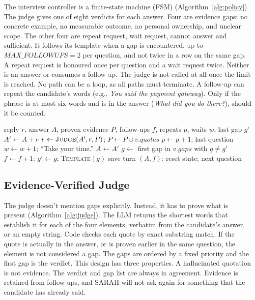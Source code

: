 \documentclass[conference]{IEEEtran}
\begin{document}
The interview controller is a finite-state machine (FSM) (Algorithm~\ref{alg:policy}). The judge gives one of eight verdicts for each answer. Four are evidence gaps: no concrete example, no measurable outcome, no personal ownership, and unclear scope. The other four are repeat request, wait request, cannot answer and sufficient. It follows its template when a gap is encountered, up to $\mathit{MAX\_FOLLOWUPS} = 2$ per question, and not twice in a row on the same gap. A repeat request is honoured once per question and a wait request twice. Neither is an answer or consumes a follow-up. The judge is not called at all once the limit is reached. No path can be a loop, as all paths must terminate. A follow-up can repeat the candidate's words (e.g., \textit{You said the payment gateway}). Only if the phrase is at most six words and is in the answer (\textit{What did you do there?}), should it be counted.

\begin{algorithm}[t]
\caption{Bounded probing policy (one reply)}
\label{alg:policy}
\small
\begin{algorithmic}
\Require reply $r$, answer $A$, proven evidence $P$, follow-ups $f$, repeats $p$, waits $w$, last gap $g'$
\State $A' \gets A + r$
 $v \gets \textsc{Judge}(A', r, P)$; $P \gets P \cup v.\mathit{quotes}$ \EndIf
{} $p \gets p+1$; \Return last question \EndIf
{} $w \gets w+1$; \Return ``Take your time.'' \EndIf
\State $A \gets A'$
  \State $g \gets$ first gap in $v.\mathit{gaps}$ with $g \neq g'$
   $f \gets f+1$; $g' \gets g$; \Return \textsc{Template}$(g)$ \EndIf
\EndIf
\State save turn $(A, f)$; reset state; \Return next question
\end{algorithmic}
\end{algorithm}

\subsection{Evidence-Verified Judge}

The judge doesn't mention gaps explicitly. Instead, it has to prove what is present (Algorithm~\ref{alg:judge}). The LLM returns the shortest words that establish it for each of the four elements, verbatim from the candidate's answer, or an empty string. Code checks each quote by exact substring match. If the quote is actually in the answer, or is proven earlier in the same question, the element is not considered a gap. The gaps are ordered by a fixed priority and the first gap is the verdict. This design has three properties. A hallucinated quotation is not evidence. The verdict and gap list are always in agreement. Evidence is retained from follow-ups, and SARAH will not ask again for something that the candidate has already said.
\end{document}
